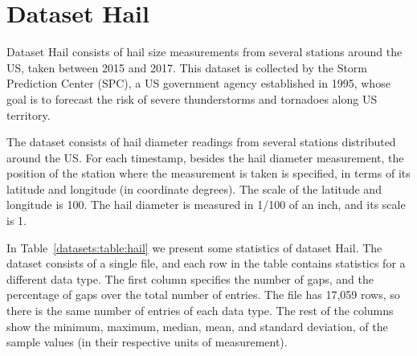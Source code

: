 
\section{Dataset Hail}
\label{datasets:hail}
\newcommand{\SPCDef}{This dataset is collected by the Storm Prediction Center (SPC), a US government agency established in 1995, whose goal is to forecast the risk of severe thunderstorms and tornadoes along US territory.}

\vspace{-5pt}
Dataset Hail \cite{dataset:spc} consists of hail size measurements from several stations around the US, taken between 2015 and 2017. \SPCDef


The dataset consists of hail diameter readings from several stations distributed around the US. For each timestamp, besides the hail diameter measurement, the position of the station where the measurement is taken is specified, in terms of its latitude and longitude (in coordinate degrees). The scale of the latitude and longitude is 100. The hail diameter is measured in 1/100 of an inch, and its scale is 1.


\newcommand{\SPCTable}{The dataset consists of a single file, and each row in the table contains statistics for a different data type. The first column specifies the number of gaps, and the percentage of gaps over the total number of entries. }

In Table~\ref{datasets:table:hail} we present some statistics of dataset Hail. \SPCTable The file has 17,059 rows, so there is the same number of entries of each data type. The rest of the columns show the minimum, maximum, median, mean, and standard deviation, of the sample values (in their respective units of measurement).



